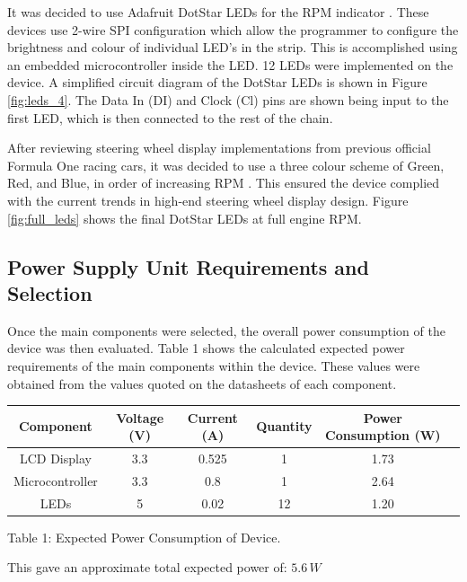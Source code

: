 \documentclass[a4paper,12pt]{article}
\begin{document}
It was decided to use Adafruit DotStar LEDs for the RPM indicator \cite{dotstar_datasheet}. These devices use 2-wire SPI configuration which allow the programmer to configure the brightness and colour of individual LED’s in the strip. This is accomplished using an embedded microcontroller inside the LED. 12 LEDs were implemented on the device. A simplified circuit diagram of the DotStar LEDs is shown in Figure \ref{fig:leds_4}. The Data In (DI) and Clock (Cl) pins are shown being input to the first LED, which is then connected to the rest of the chain.



After reviewing steering wheel display implementations from previous official Formula One racing cars, it was decided to use a three colour scheme of Green, Red, and Blue, in order of increasing RPM \cite{bsim_racing, daily_mail_1}. This ensured the device complied with the current trends in high-end steering wheel display design. Figure \ref{fig:full_leds} shows the final DotStar LEDs at full engine RPM.



\newpage
\subsection{Power Supply Unit Requirements and Selection}
\label{sec:PSU}

Once the main components were selected, the overall power consumption of the device was then evaluated. Table 1 shows the calculated expected power requirements of the main components within the device. These values were obtained from the values quoted on the datasheets of each component.

\begin{center}
\begin{tabular}{ | c | c | c | c | c | c | }
\hline
 Component & Voltage (V) & Current (A) & Quantity & Power Consumption (W) \\
\hline
 LCD Display & 3.3 & 0.525 & 1 & 1.73 \\
\hline
 Microcontroller & 3.3 & 0.8 & 1 & 2.64 \\
\hline
 LEDs & 5 & 0.02 & 12 & 1.20 \\
\hline
\end{tabular}
\par
\bigskip
Table 1: Expected Power Consumption of Device.
\end{center}

This gave an approximate total expected power of: $5.6\, W$ \\
\end{document}
